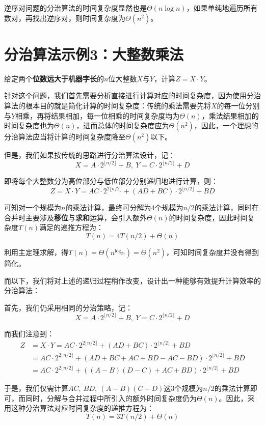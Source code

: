 \documentclass[12pt,a4paper,violet,oneside]{bbe}
\begin{document}
逆序对问题的分治算法的时间复杂度显然也是$\Theta(n\log n)$，如果单纯地遍历所有数对，再找出逆序对，则时间复杂度为$\Theta(n^2)$。
\section{分治算法示例3：大整数乘法}
\begin{example}
	给定两个\textbf{位数远大于}\textbf{机器字长}的$n$位大整数$X$与$Y$，计算$Z=X\cdot Y$。
\end{example}

针对这个问题，我们首先需要分析直接进行计算对应的时间复杂度，因为使用分治算法的根本目的就是简化计算的时间复杂度：传统的乘法需要先将$X$的每一位分别与$Y$相乘，再将结果相加，每一位相乘的时间复杂度均为$\Theta(n)$，乘法结果相加的时间复杂度也为$\Theta(n)$，进而总体的时间复杂度应为$\Theta(n^2)$，因此，一个理想的分治算法应当将计算的时间复杂度降至$\Theta(n^2)$以下。

但是，我们如果按传统的思路进行分治算法设计，记：
$$
X=A\cdot2^{\lfloor n/2\rfloor}+B,~Y=C\cdot2^{\lfloor n/2\rfloor}+D
$$

即将每个大整数分为高位部分与低位部分分别递归地进行计算，则：
$$
Z=X\cdot Y=AC\cdot2^{2\lfloor n/2\rfloor}+(AD+BC)\cdot2^{\lfloor n/2\rfloor}+BD
$$

可知对一个规模为$n$的乘法计算，最终可分解为$4$个规模为$n/2$的乘法计算，同时在合并时主要涉及\textbf{移位}与\textbf{求和}运算，会引入额外$\Theta(n)$的时间复杂度，因此时间复杂度$T(n)$满足的递推方程为：
$$
T(n)=4T(n/2)+\Theta(n)
$$

利用主定理求解，得$T(n)=\Theta(n^{\log_24})=\Theta(n^2)$，可知时间复杂度并没有得到简化。

而以下，我们将对上述的递归过程稍作改变，设计出一种能够有效提升计算效率的分治算法：

首先，我们仍采用相同的分治策略，记：
$$
X=A\cdot2^{\lfloor n/2\rfloor}+B,~Y=C\cdot2^{\lfloor n/2\rfloor}+D
$$

而我们注意到：
$$
\begin{array}{rl}
	Z&=X\cdot Y=AC\cdot2^{2\lfloor n/2\rfloor}+(AD+BC)\cdot2^{\lfloor n/2\rfloor}+BD\\
	&=AC\cdot2^{2\lfloor n/2\rfloor}+(AD+BC+AC+BD-AC-BD)\cdot2^{\lfloor n/2\rfloor}+BD\\
	&=AC\cdot2^{2\lfloor n/2\rfloor}+((A-B)(D-C)+AC+BD)\cdot2^{\lfloor n/2\rfloor}+BD
\end{array}
$$

于是，我们仅需计算$AC,~BD,~(A-B)(C-D)$这$3$个规模为$n/2$的乘法计算即可，而同时，分解与合并过程中所引入的额外时间复杂度仍为$\Theta(n)$。因此，采用这种分治算法对应时间复杂度的递推方程为：
$$
T(n)=3T(n/2)+\Theta(n)
$$
\end{document}
